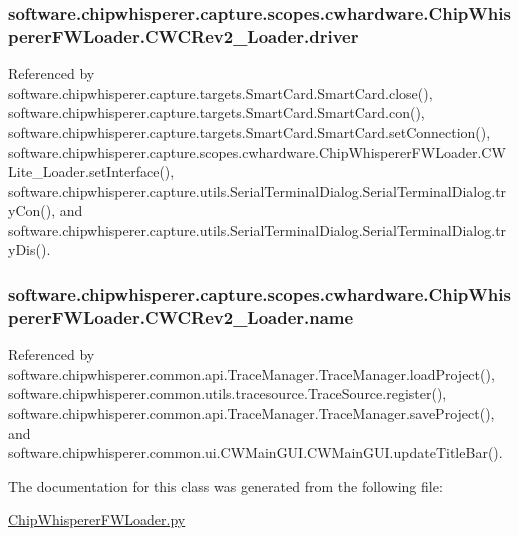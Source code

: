 \subsubsection[{driver}]{\setlength{\rightskip}{0pt plus 5cm}software.\+chipwhisperer.\+capture.\+scopes.\+cwhardware.\+Chip\+Whisperer\+F\+W\+Loader.\+C\+W\+C\+Rev2\+\_\+\+Loader.\+driver}\label{classsoftware_1_1chipwhisperer_1_1capture_1_1scopes_1_1cwhardware_1_1ChipWhispererFWLoader_1_1CWCRev2__Loader_a3d3c044dbbbabc567a1dae12b6dbb3f7}


Referenced by software.\+chipwhisperer.\+capture.\+targets.\+Smart\+Card.\+Smart\+Card.\+close(), software.\+chipwhisperer.\+capture.\+targets.\+Smart\+Card.\+Smart\+Card.\+con(), software.\+chipwhisperer.\+capture.\+targets.\+Smart\+Card.\+Smart\+Card.\+set\+Connection(), software.\+chipwhisperer.\+capture.\+scopes.\+cwhardware.\+Chip\+Whisperer\+F\+W\+Loader.\+C\+W\+Lite\+\_\+\+Loader.\+set\+Interface(), software.\+chipwhisperer.\+capture.\+utils.\+Serial\+Terminal\+Dialog.\+Serial\+Terminal\+Dialog.\+try\+Con(), and software.\+chipwhisperer.\+capture.\+utils.\+Serial\+Terminal\+Dialog.\+Serial\+Terminal\+Dialog.\+try\+Dis().

\hypertarget{classsoftware_1_1chipwhisperer_1_1capture_1_1scopes_1_1cwhardware_1_1ChipWhispererFWLoader_1_1CWCRev2__Loader_ae1c928f1cdcb05cf18d76c1a0630a712}{}
\subsubsection[{name}]{\setlength{\rightskip}{0pt plus 5cm}software.\+chipwhisperer.\+capture.\+scopes.\+cwhardware.\+Chip\+Whisperer\+F\+W\+Loader.\+C\+W\+C\+Rev2\+\_\+\+Loader.\+name}\label{classsoftware_1_1chipwhisperer_1_1capture_1_1scopes_1_1cwhardware_1_1ChipWhispererFWLoader_1_1CWCRev2__Loader_ae1c928f1cdcb05cf18d76c1a0630a712}


Referenced by software.\+chipwhisperer.\+common.\+api.\+Trace\+Manager.\+Trace\+Manager.\+load\+Project(), software.\+chipwhisperer.\+common.\+utils.\+tracesource.\+Trace\+Source.\+register(), software.\+chipwhisperer.\+common.\+api.\+Trace\+Manager.\+Trace\+Manager.\+save\+Project(), and software.\+chipwhisperer.\+common.\+ui.\+C\+W\+Main\+G\+U\+I.\+C\+W\+Main\+G\+U\+I.\+update\+Title\+Bar().



The documentation for this class was generated from the following file\+:\begin{DoxyCompactItemize}
\item 
\hyperlink{ChipWhispererFWLoader_8py}{Chip\+Whisperer\+F\+W\+Loader.\+py}\end{DoxyCompactItemize}
